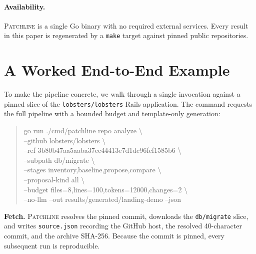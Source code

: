 \documentclass[11pt]{article}
\newcommand{\tool}{\textsc{Patchline}}
\newcommand{\code}[1]{\texttt{#1}}
\begin{document}
\paragraph{Availability.} \tool{} is a single Go binary with no required external services. Every
result in this paper is regenerated by a \code{make} target against pinned public repositories.

\appendix
\section{A Worked End-to-End Example}
\label{app:worked}

To make the pipeline concrete, we walk through a single invocation against a pinned slice of the
\code{lobsters/lobsters} Rails application. The command requests the full pipeline with a bounded
budget and template-only generation:

\begin{quote}\small\ttfamily
go run ./cmd/patchline repo analyze \textbackslash\\
\hspace*{1em}--github lobsters/lobsters \textbackslash\\
\hspace*{1em}--ref 3b80b47aa5aaba37ec44413e7d1dc96fcf1585b6 \textbackslash\\
\hspace*{1em}--subpath db/migrate \textbackslash\\
\hspace*{1em}--stages inventory,baseline,propose,compare \textbackslash\\
\hspace*{1em}--proposal-kind all \textbackslash\\
\hspace*{1em}--budget files=8,lines=100,tokens=12000,changes=2 \textbackslash\\
\hspace*{1em}--no-llm --out results/generated/landing-demo --json
\end{quote}

\noindent
\textbf{Fetch.} \tool{} resolves the pinned commit, downloads the \code{db/migrate} slice, and writes
\code{source.json} recording the GitHub host, the resolved 40-character commit, and the archive
SHA-256. Because the commit is pinned, every subsequent run is reproducible.
\end{document}
